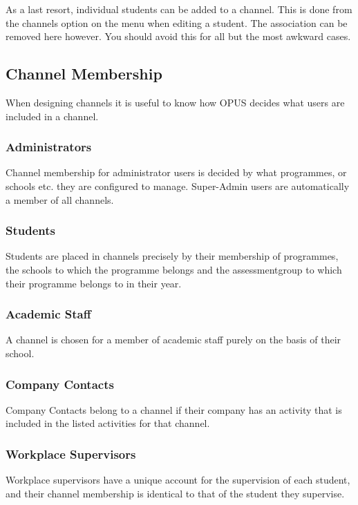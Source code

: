 \documentclass[12 pt]{book}
\begin{document}
As a last resort, individual students can be added to a channel. This is done
from the channels option on the menu when editing a student. The association
can be removed here however. You should avoid this for all but the most
awkward cases.

\subsection{Channel Membership}

When designing channels it is useful to know how OPUS decides what users are
included in a channel.

\subsubsection{Administrators}

Channel membership for administrator users is decided by what programmes, or
schools etc. they are configured to manage. Super-Admin users are automatically
a member of all channels.

\subsubsection{Students}

Students are placed in channels precisely by their membership of programmes,
the schools to which the programme belongs and the assessmentgroup to which
their programme belongs to in their year.

\subsubsection{Academic Staff}

A channel is chosen for a member of academic staff purely on the basis of their
school.

\subsubsection{Company Contacts}

Company Contacts belong to a channel if their company has an activity that is
included in the listed activities for that channel.

\subsubsection{Workplace Supervisors}

Workplace supervisors have a unique account for the supervision of each student,
and their channel membership is identical to that of the student they
supervise.
\end{document}
